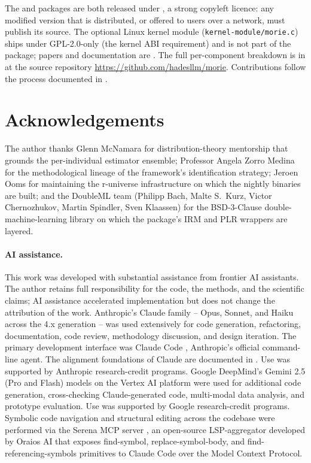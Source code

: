 \documentclass[article,shortnames,nojss]{jss}
\begin{document}
The  and  packages are both released
under , a strong copyleft licence: any
modified version that is distributed, or offered to users over a
network, must publish its source.  The optional Linux kernel module
(\texttt{kernel-module/morie.c}) ships under GPL-2.0-only (the
kernel ABI requirement) and is not part of the package; papers and
documentation are .  The full per-component breakdown is in
 at the source repository
\url{https://github.com/hadesllm/morie}.  Contributions follow
the process documented in .

\section*{Acknowledgements}

The author thanks Glenn McNamara for distribution-theory
mentorship that grounds the per-individual estimator ensemble;
Professor Angela Zorro Medina for the methodological lineage of
the framework's identification strategy; Jeroen Ooms for
maintaining the r-universe infrastructure on which the 
nightly binaries are built; and the DoubleML team (Philipp Bach,
Malte S.\ Kurz, Victor Chernozhukov, Martin Spindler, Sven
Klaassen) for the BSD-3-Clause double-machine-learning library on
which the package's IRM and PLR wrappers are layered.

\paragraph*{AI assistance.}
This work was developed with substantial assistance from frontier
AI assistants.  The author retains full responsibility for the
code, the methods, and the scientific claims; AI assistance
accelerated implementation but does not change the attribution of
the work.  Anthropic's Claude family -- Opus, Sonnet, and Haiku
across the 4.x generation \citep{Anthropic2024ClaudeFamily} -- was
used extensively for code generation, refactoring, documentation,
code review, methodology discussion, and design iteration.  The
primary development interface was Claude Code
\citep{Anthropic2024ClaudeCode}, Anthropic's official
command-line agent.  The alignment foundations of Claude are
documented in \citet{Bai2022ConstitutionalAI}.  Use was supported
by Anthropic research-credit programs.  Google DeepMind's
Gemini 2.5 (Pro and Flash) models
\citep{GoogleDeepMind2024Gemini} on the Vertex AI platform
\citep{GoogleCloud2024VertexAI} were used for additional code
generation, cross-checking Claude-generated code, multi-modal
data analysis, and prototype evaluation.  Use was supported by
Google research-credit programs.  Symbolic code
navigation and structural editing across the codebase were
performed via the Serena MCP server \citep{Oraios2024Serena},
an open-source LSP-aggregator developed by Oraios AI that exposes
find-symbol, replace-symbol-body, and find-referencing-symbols
primitives to Claude Code over the Model Context Protocol.

\end{document}
